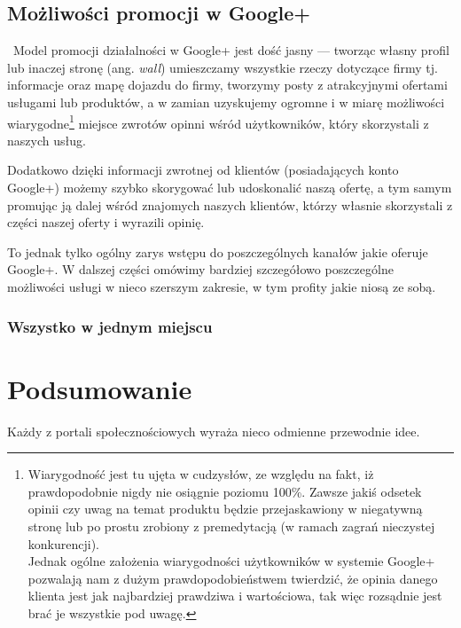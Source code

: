 
\subsection{Możliwości promocji w Google+}
\
Model promocji działalności w Google+ jest dość jasny --- tworząc własny profil lub inaczej stronę (ang. \textit{wall}) umieszczamy wszystkie rzeczy dotyczące firmy tj. informacje oraz mapę dojazdu do firmy, tworzymy posty z atrakcyjnymi ofertami usługami lub produktów, a w zamian uzyskujemy ogromne i w miarę możliwości wiarygodne\footnote{Wiarygodność jest tu ujęta w cudzysłów, ze względu na fakt, iż prawdopodobnie nigdy nie osiągnie poziomu 100\%. Zawsze jakiś odsetek opinii czy uwag na temat produktu będzie przejaskawiony w niegatywną stronę lub po prostu zrobiony z premedytacją (w ramach zagrań nieczystej konkurencji).\\ Jednak ogólne założenia wiarygodności użytkowników w systemie Google+ pozwalają nam z dużym prawdopodobieństwem twierdzić, że opinia danego klienta jest jak najbardziej prawdziwa i wartościowa, tak więc rozsądnie jest brać je wszystkie pod uwagę.} miejsce zwrotów opinni wśród użytkowników, który skorzystali z naszych usług. 

\noindent Dodatkowo dzięki informacji zwrotnej od klientów (posiadających konto Google+) możemy szybko skorygować lub udoskonalić naszą ofertę, a tym samym promując ją dalej wśród znajomych naszych klientów, którzy własnie skorzystali z części naszej oferty i wyrazili opinię. 

To jednak tylko ogólny zarys wstępu do poszczególnych kanałów jakie oferuje Google+. W dalszej części omówimy bardziej szczegółowo poszczególne możliwości usługi w nieco szerszym zakresie, w tym profity jakie niosą ze sobą.


\subsubsection{Wszystko w jednym miejscu}


\clearpage
\section{Podsumowanie}

Każdy z portali społecznościowych wyraża nieco odmienne przewodnie idee. 
